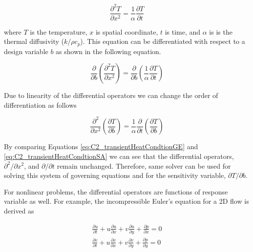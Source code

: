 \begin{equation}\label{eq:C2_transientHeatCondtionGE}
	\frac{\partial^2 T}{\partial x^2} = \frac{1}{\alpha} \frac{\partial T}{\partial t}
\end{equation}

where $T$ is the temperature, $x$ is spatial coordinate, $t$ is time, and $\alpha$ is is the thermal diffusivity ($k/\rho c_p$). This equation can be differentiated with respect to a design variable $b$ as shown in the following equation.

\begin{equation*}
	\frac{\partial}{\partial b}
	\left( \frac{\partial^2 T}{\partial x^2}\right) = 
	\frac{\partial}{\partial b}
	\left( \frac{1}{\alpha} \frac{\partial T}{\partial t}\right)
\end{equation*}

Due to linearity of the differential operators we can change the order of differentiation as follows

\begin{equation}\label{eq:C2_transientHeatCondtionSA}
	\frac{\partial^2}{\partial x^2}
	\left( \frac{\partial T}{\partial b} \right) = 
	\frac{1}{\alpha} \frac{\partial}{\partial t}
	\left( \frac{\partial T}{\partial b}\right)
\end{equation}

By comparing Equations \eqref{eq:C2_transientHeatCondtionGE} and \eqref{eq:C2_transientHeatCondtionSA} we can see that the differential operators, $\partial^2 /\partial x^2$, and $\partial /\partial t$ remain unchanged. Therefore, same solver can be used for solving this system of governing equations and for the sensitivity variable, $\partial T/\partial b$.

For nonlinear problems, the differential operators are functions of response variable as well. For example, the incompressible Euler's equation for a 2D flow is derived as

\begin{subequations}\label{eq:C2_eulerEquations}
\begin{gather}
	\frac{\partial u}{\partial t} +
	u \frac{\partial u}{\partial x} + v \frac{\partial u}{\partial y} +
	\frac{\partial p}{\partial x} = 0 
	\\
	\frac{\partial v}{\partial t} +
	u \frac{\partial v}{\partial x} + v \frac{\partial v}{\partial y} +
	\frac{\partial p}{\partial y} = 0
\end{gather}
\end{subequations}

